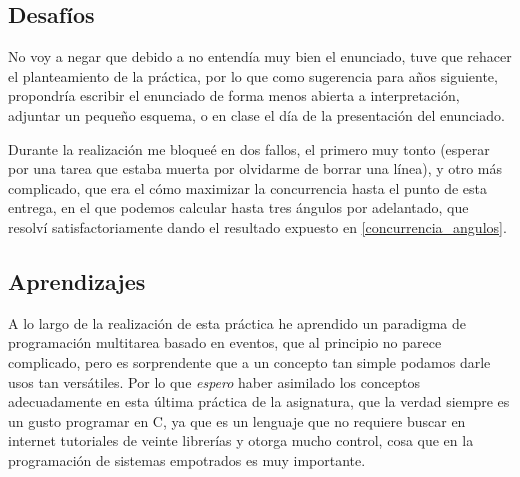 \documentclass[a4paper,openright,12pt]{article}
\begin{document}
\subsection{Desafíos}
No voy a negar que debido a no entendía muy bien el enunciado, tuve que rehacer el planteamiento de la práctica, por lo que como sugerencia para años siguiente, propondría escribir
el enunciado de forma menos abierta a interpretación, adjuntar un pequeño esquema, o en clase el día de la presentación del enunciado.

Durante la realización me bloqueé en dos fallos, el primero muy tonto (esperar por una tarea que estaba muerta por olvidarme de borrar una línea), y otro más complicado, que era el cómo
maximizar la concurrencia hasta el punto de esta entrega, en el que podemos calcular hasta tres ángulos por adelantado, que resolví satisfactoriamente dando el resultado expuesto
en \ref{concurrencia_angulos}.

\subsection{Aprendizajes}
A lo largo de la realización de esta práctica he aprendido un paradigma de programación multitarea basado en eventos, que al principio no parece complicado, pero es sorprendente que
a un concepto tan simple podamos darle usos tan versátiles. Por lo que \emph{espero} haber asimilado los conceptos adecuadamente en esta última práctica de la asignatura, que la verdad
siempre es un gusto programar en C, ya que es un lenguaje que no requiere buscar en internet tutoriales de veinte librerías y otorga mucho control, cosa que en la programación de sistemas
empotrados es muy importante.


\clearpage
\begin{flushleft}
\printbibliography[]{}
\end{flushleft}
\end{document}
